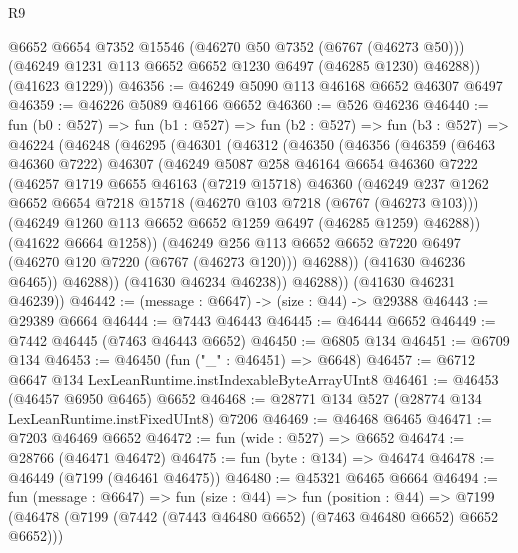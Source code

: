 \begin{lexlean}{R9}
\begin{coremodule}
        @6652
        @6654
        @7352
        @15546
        (@46270 @50 @7352 (@6767 (@46273 @50)))
        (@46249 @1231 @113 @6652 @6652 @1230 @6497 (@46285 @1230) @46288))
      (@41623 @1229))
@46356 := @46249 @5090 @113 @46168 @6652 @46307 @6497
@46359 := @46226 @5089 @46166 @6652
@46360 := @526 @46236
@46440 := fun (b0 : @527) =>
  fun (b1 : @527) =>
  fun (b2 : @527) =>
  fun (b3 : @527) =>
  @46224
    (@46248
      (@46295
        (@46301
          (@46312
            (@46350
              (@46356
                (@46359
                  (@6463 @46360 @7222)
                  @46307
                  (@46249
                    @5087
                    @258
                    @46164
                    @6654
                    @46360
                    @7222
                    (@46257
                      @1719
                      @6655
                      @46163
                      (@7219 @15718)
                      @46360
                      (@46249
                        @237
                        @1262
                        @6652
                        @6654
                        @7218
                        @15718
                        (@46270 @103 @7218 (@6767 (@46273 @103)))
                        (@46249 @1260 @113 @6652 @6652 @1259 @6497 (@46285 @1259) @46288))
                      (@41622 @6664 @1258))
                    (@46249
                      @256
                      @113
                      @6652
                      @6652
                      @7220
                      @6497
                      (@46270 @120 @7220 (@6767 (@46273 @120)))
                      @46288))
                  (@41630 @46236 @6465))
                @46288))
            (@41630 @46234 @46238))
          @46288))
      (@41630 @46231 @46239))
@46442 := (message : @6647) -> (size : @44) -> @29388
@46443 := @29389 @6664
@46444 := @7443 @46443
@46445 := @46444 @6652
@46449 := @7442 @46445 (@7463 @46443 @6652)
@46450 := @6805 @134
@46451 := @6709 @134
@46453 := @46450 (fun ("_" : @46451) => @6648)
@46457 := @6712 @6647 @134 LexLeanRuntime.instIndexableByteArrayUInt8
@46461 := @46453 (@46457 @6950 @6465) @6652
@46468 := @28771 @134 @527 (@28774 @134 LexLeanRuntime.instFixedUInt8) @7206
@46469 := @46468 @6465
@46471 := @7203 @46469 @6652
@46472 := fun (wide : @527) => @6652
@46474 := @28766 (@46471 @46472)
@46475 := fun (byte : @134) => @46474
@46478 := @46449 (@7199 (@46461 @46475))
@46480 := @45321 @6465 @6664
@46494 := fun (message : @6647) =>
  fun (size : @44) =>
  fun (position : @44) =>
  @7199 (@46478 (@7199 (@7442 (@7443 @46480 @6652) (@7463 @46480 @6652) @6652 @6652)))

\end{coremodule}
\end{lexlean}
